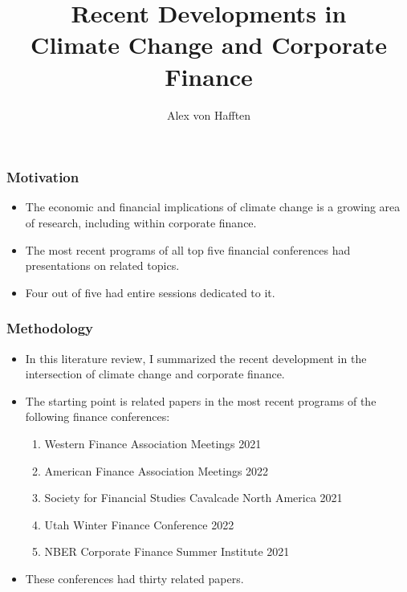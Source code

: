 \documentclass[handout]{beamer}
\title[Climate Change and Corporate Finance]{Recent Developments in \\ Climate Change and Corporate Finance}
\author{Alex von Hafften}
\institute{UW-Madison}
\begin{document}
\begin{frame}
\titlepage
\end{frame}

\begin{frame}
\frametitle{Motivation}

\begin{itemize}[<+->]

\item The economic and financial implications of climate change is a growing area of research, including within corporate finance.

\bigskip

\item The most recent programs of all top five financial conferences had presentations on related topics.

\bigskip

\item Four out of five had entire sessions dedicated to it.

\end{itemize}

\end{frame}

\begin{frame}
\frametitle{Methodology}

\begin{itemize}[<+->]

\item In this literature review, I summarized the recent development in the intersection of climate change and corporate finance.

\bigskip

\item The starting point is related papers in the most recent programs of the following finance conferences:

\begin{enumerate}

\item Western Finance Association Meetings 2021
\item American Finance Association Meetings 2022
\item Society for Financial Studies Cavalcade North America 2021
\item Utah Winter Finance Conference 2022
\item NBER Corporate Finance Summer Institute 2021

\end{enumerate}

\bigskip

\item These conferences had thirty related papers.

\end{itemize}

\end{frame}
\end{document}
